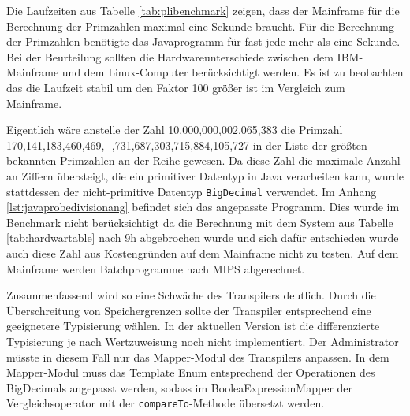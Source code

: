 Die Laufzeiten aus Tabelle \ref{tab:plibenchmark} zeigen, dass der Mainframe für die Berechnung der Primzahlen maximal eine Sekunde braucht. Für die Berechnung der Primzahlen benötigte das Javaprogramm für fast jede mehr als eine Sekunde. Bei der Beurteilung sollten die Hardwareunterschiede zwischen dem IBM-Mainframe und dem Linux-Computer berücksichtigt werden. Es ist zu beobachten das die Laufzeit stabil um den Faktor 100 größer ist im Vergleich zum Mainframe.

Eigentlich wäre anstelle der Zahl 10,000,000,002,065,383 die Primzahl 170,141,183,460,469,- ,731,687,303,715,884,105,727 in der Liste der größten bekannten Primzahlen an der Reihe gewesen. 
Da diese Zahl die maximale Anzahl an Ziffern übersteigt, die ein primitiver Datentyp in Java verarbeiten kann, wurde stattdessen der nicht-primitive Datentyp \verb+BigDecimal+ verwendet. Im Anhang \ref{lst:javaprobedivisionang} befindet sich das angepasste Programm. 
Dies wurde im Benchmark nicht berücksichtigt da die Berechnung mit dem System aus Tabelle \ref{tab:hardwartable} nach 9h abgebrochen wurde und sich dafür entschieden wurde auch diese Zahl aus Kostengründen auf dem Mainframe nicht zu testen. Auf dem Mainframe werden Batchprogramme nach \ac{MIPS} abgerechnet.

Zusammenfassend wird so eine Schwäche des Transpilers deutlich. Durch die Überschreitung von Speichergrenzen sollte der Transpiler entsprechend eine geeignetere Typisierung wählen. In der aktuellen Version ist die differenzierte Typisierung je nach Wertzuweisung noch nicht implementiert. Der Administrator müsste in diesem Fall nur das Mapper-Modul des Transpilers anpassen. In dem Mapper-Modul muss das Template Enum entsprechend der Operationen des BigDecimals angepasst werden, sodass im BooleaExpressionMapper der Vergleichsoperator mit der \verb+compareTo+-Methode übersetzt werden.
\pagebreak

